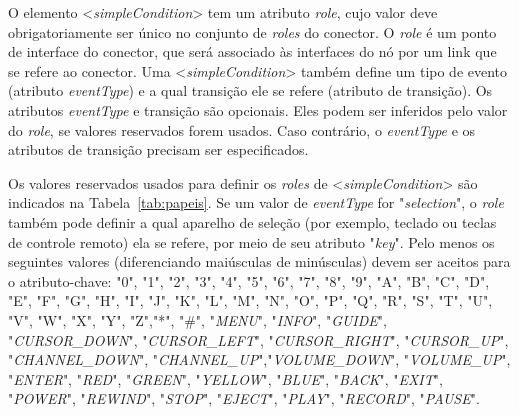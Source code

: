  O elemento <\textit{simpleCondition}> tem um atributo \textit{role}, cujo valor deve obrigatoriamente ser único no conjunto de \textit{roles} do conector. O \textit{role} é um ponto de interface do conector, que será associado às interfaces do nó por um link que se refere ao conector. Uma <\textit{simpleCondition}> também define um tipo de evento (atributo \textit{eventType}) e a qual transição ele se refere (atributo de transição). Os atributos \textit{eventType} e transição são opcionais. Eles podem ser inferidos pelo valor do \textit{role}, se valores reservados forem usados. Caso contrário, o \textit{eventType} e os atributos de transição precisam ser especificados.

Os valores reservados usados para definir os \textit{roles} de <\textit{simpleCondition}> são indicados na Tabela~\ref{tab:papeis}. Se um valor de \textit{eventType} for "\textit{selection}", o \textit{role} também pode definir a qual aparelho de seleção (por exemplo, teclado ou teclas de controle remoto) ela se refere, por meio de seu atributo "\textit{key}". Pelo menos os seguintes valores (diferenciando maiúsculas de minúsculas) devem ser aceitos para o atributo-chave: "0", "1", "2", "3", "4", "5", "6", "7", "8", "9", "A", "B", "C", "D", "E", "F", "G", "H", "I", "J", "K", "L", "M", "N", "O", "P", "Q", "R", "S", "T", "U", "V", "W", "X", "Y", "Z","*", "\#", "\textit{MENU}", "\textit{INFO}", "\textit{GUIDE}", "\textit{CURSOR\_DOWN}", "\textit{CURSOR\_LEFT}", "\textit{CURSOR\_RIGHT}", "\textit{CURSOR\_UP}", "\textit{CHANNEL\_DOWN}", "\textit{CHANNEL\_UP}","\textit{VOLUME\_DOWN}", 
"\textit{VOLUME\_UP}", "\textit{ENTER}", "\textit{RED}", "\textit{GREEN}", "\textit{YELLOW}", "\textit{BLUE}", "\textit{BACK}", "\textit{EXIT}", "\textit{POWER}", "\textit{REWIND}", "\textit{STOP}", "\textit{EJECT}", "\textit{PLAY}", "\textit{RECORD}", "\textit{PAUSE}". 

